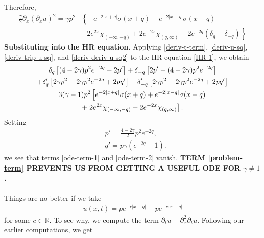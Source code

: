 \documentclass[12pt,reqno]{amsart}
\numberwithin{equation}{section}  %
\numberwithin{figure}{section}
\newcommand{\medno}{\medskip\noindent}
\newcommand{\rr}{\mathbb{R}}
\newcommand{\p}{\partial}
\theoremstyle{plain}  %
\theoremstyle{definition}
\begin{document}
%
Therefore,
%
%
\begin{equation}
  \begin{split}
    \label{deriv-deriv-u-sq2}
    \frac{\gamma}{2}\p_x (\p_x u)^2
    = \gamma p^2 & \left\{ - e^{-2 | x+q |} \sigma(x+q) -  e^{-2| x-q
    |}\sigma(x-q) \right.
    \\
    & \left. - 2 e^{2x} \chi_{(-\infty, -q)} 
    + 2 e^{-2x} \chi_{(q, \infty)}
    - 2e^{-2q}(\delta_{q} - \delta_{-q}) \right \}
  \end{split}
\end{equation}
%
%
%
%
%
%
\medno
{\bf Substituting into the HR equation.}
Applying	\eqref{deriv-t-term},
\eqref{deriv-u-sq}, \eqref{deriv-trip-u-sq}, and \eqref{deriv-deriv-u-sq2} to the
HR equation \eqref{HR-1}, we
obtain
%
%
%
\begin{gather}
  \label{ode-term-1}
  \delta_{q}\left [(4-2\gamma)p^{2}e^{-2q} - 2p' \right ]
  + \delta_{-q} \left [2p' - (4-2 \gamma)p^{2}e^{-2q} \right ]
  \\
  \label{ode-term-2}
  + \delta_{q}'\left [2\gamma p^2 - 2 \gamma p^2e^{-2q} + 2 pq' \right ]
  + \delta_{-q}'  \left [2 \gamma p^{2} - 2 \gamma p^{2}e^{-2q} + 2pq' \right ]
  \\
  \label{problem-term}
  3(\gamma -1)p^{2}\left[ e^{-2| x+q |}\sigma(x+q) + e^{-2| x-q |}
  \sigma(x-q) \right.
  \\
  \notag
  + \left. 2e^{2x} \chi_{(-\infty, -q)} - 2e^{-2x} \chi_{(q, \infty)} \right ].
\end{gather}
%
Setting 
\begin{equation}
  \label{dif-eq}
  \begin{split}
    & p' =\frac{4-2\gamma}{2} p^2 e^{-2q}, 
    \\
    & q'=p\gamma(e^{-2q} -1).
  \end{split}
\end{equation}
we see that terms \eqref{ode-term-1} and \eqref{ode-term-2} vanish. 
%
\textbf{TERM \eqref{problem-term} PREVENTS US FROM GETTING A USEFUL ODE FOR $\gamma
\neq1$.}
%
\\
\\
Things are no better if we take
%
%
\begin{equation*}
  \begin{split}
    u(x,t) = p e^{-c| x + q |} - p e^{-c| x-q |}
  \end{split}
\end{equation*}
%
%
for some $c \in \rr$. To see why, we compute the term $\p_t u-\p_{x}^2\p_t u$.
Following our earlier computations, we get 
\end{document}
